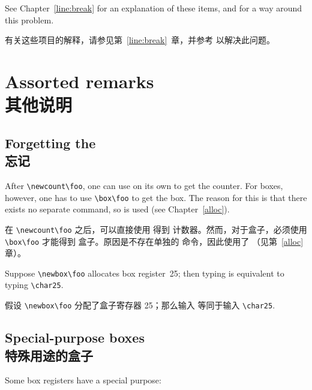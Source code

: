 See Chapter~\ref{line:break} for an explanation of these
items, and \cite{Downs} for a way around this problem.

有关这些项目的解释，请参见第~\ref{line:break}~章，并参考 \cite{Downs} 以解决此问题。


\section{Assorted remarks\\其他说明}

\subsection{Forgetting the \\忘记 }

After \verb.\newcount\foo., one can use  on its own
to get the  counter.
For  boxes, however, one has to use \verb.\box\foo. to get
the  box.
The reason for this is that there exists
no separate  command, so  is
used (see Chapter~\ref{alloc}). 

在 \verb.\newcount\foo. 之后，可以直接使用  得到  计数器。然而，对于盒子，必须使用 \verb.\box\foo. 才能得到  盒子。原因是不存在单独的  命令，因此使用了 （见第~\ref{alloc} 章）。
\begin{example}
Suppose \verb.\newbox\foo. allocates box register~25; then
typing  is equivalent  to typing
\verb.\char25..

假设 \verb.\newbox\foo. 分配了盒子寄存器 25；那么输入  等同于输入 \verb.\char25..
\end{example}

\subsection{Special-purpose boxes\\特殊用途的盒子}

Some   box registers 
have a special
purpose:

